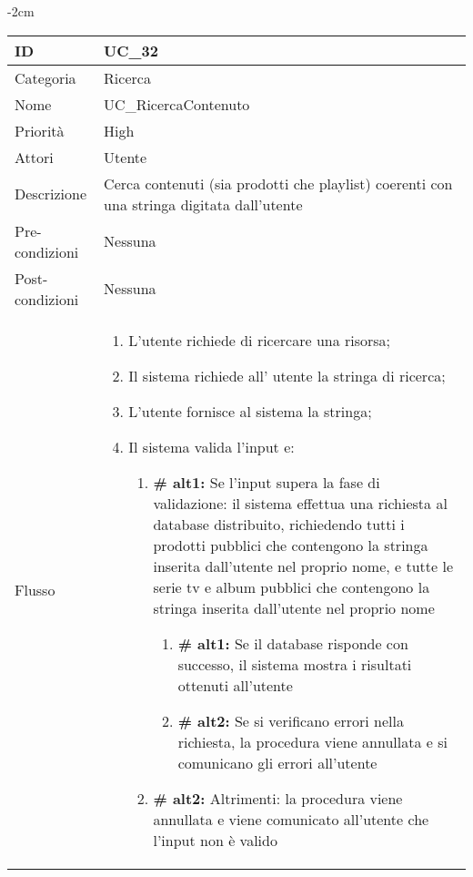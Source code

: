 \begin{center}
\begin{table}[bp]
    \centering
    \addtolength{\leftskip} {-2cm}
\begin{tabular}{ |p{2.6cm}|p{13cm}|  }
\hline
ID & UC\_32 \\\hline
Categoria & Ricerca \\\hline
Nome & UC\_RicercaContenuto\\\hline
Priorità & High \\\hline
Attori &  Utente \\\hline
Descrizione & Cerca contenuti (sia prodotti che playlist) coerenti con una stringa digitata dall'utente\\\hline
Pre-condizioni &  Nessuna\\\hline
Post-condizioni &  Nessuna\\\hline
Flusso &  	\vspace{-5mm} \begin{enumerate}
			\item L'utente richiede di ricercare una risorsa;
			\item Il sistema richiede all' utente la stringa di ricerca;
			\item L'utente fornisce al sistema la stringa;
			\item Il sistema valida l'input e:
			\begin{enumerate}[label*=\arabic*.]
			\item \textbf{\# alt1:} Se l'input supera la fase di validazione: il sistema effettua una richiesta al database distribuito, richiedendo tutti i prodotti pubblici che contengono la stringa inserita dall'utente nel proprio nome, e tutte le serie tv e album pubblici che contengono la stringa inserita dall'utente nel proprio nome
				\begin{enumerate}[label*=\arabic*.]
					\item \textbf{\# alt1:} Se il database risponde con successo, il sistema mostra i risultati ottenuti all'utente
					\item \textbf{\# alt2:} Se si verificano errori nella richiesta, la procedura viene annullata e si comunicano gli errori all'utente
				\end{enumerate}
			\item \textbf{\# alt2:} Altrimenti: la procedura viene annullata e viene comunicato all'utente che l'input non è valido
			\end{enumerate}
			
		\end{enumerate}\\\hline
\end{tabular}
\label{table_use_case:32}\newline
\end{table}


\end{center}
